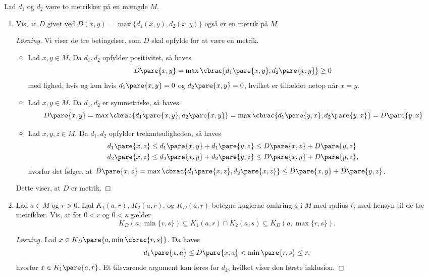 \documentclass{article}
\begin{document}
\begin{opg}
Lad $d_1$ og $d_2$ være to metrikker på en
mængde $M$.  
\begin{enumerate}
\item
Vis, at $D$ givet ved $D(x,y)=\max\{d_1(x,y),d_2(x,y)\}$ også er en metrik på $M$.

\begin{proof}[Løsning]
Vi viser de tre betingelser, som $D$ skal opfylde for at være en metrik.
\begin{itemize}
    \item Lad $x,y\in M$. Da $d_1,d_2$ opfylder positivitet, så haves 
    $$ D\pare{x,y} = \max\cbrac{d_1\pare{x,y},d_2\pare{x,y}} \geq 0 $$
    med lighed, hvis og kun hvis $d_1\pare{x,y} = 0$ og $d_2\pare{x,y} = 0$, hvilket er tilfældet netop når $x = y$.
    
    \item Lad $x,y\in M$. Da $d_1,d_2$ er symmetriske, så haves
    $$ D\pare{x,y} = \max\cbrac{d_1\pare{x,y},d_2\pare{x,y}}
        = \max\cbrac{d_1\pare{y,x},d_2\pare{y,x}} = D\pare{y,x} $$
    
    \item Lad $x,y,z\in M$. Da $d_1,d_2$ opfylder trekantsuligheden, så haves
    \begin{align*}
        d_1\pare{x,z} &\leq d_1\pare{x,y} + d_1\pare{y,z}
            \leq D\pare{x,z} + D\pare{y,z} \\
        d_2\pare{x,z} &\leq d_2\pare{x,y} + d_2\pare{y,z}
            \leq D\pare{x,y} + D\pare{y,z},
    \end{align*}
    hvorfor det følger, at $D\pare{x,z} = \max\cbrac{d_1\pare{x,z},d_2\pare{x,z}} \leq D\pare{x,y} + D\pare{y,z}$.
\end{itemize}
Dette viser, at $D$ er metrik.
\end{proof}

\item Lad $a\in M$ og $r>0$. Lad $K_1(a,r)$, $K_2(a,r)$, og $K_D(a,r)$ betegne kuglerne omkring $a$ i $M$ med radius $r$, med hensyn til de tre metrikker. Vis, at for $0<r$ og $0<s$ gælder
$$ K_D(a,\min\{r,s\})\subseteq K_1(a,r)\cap K_2(a,s)  \subseteq K_D(a,\max\{r,s\}). $$

\begin{proof}[Løsning]
Lad $x\in K_D\pare{a,\min\cbrac{r,s}}$. Da haves
$$ d_1\pare{x,a} \leq D\pare{x,a} < \min\pare{r,s} \leq r, $$
hvorfor $x\in K_1\pare{a,r}$. Et tilsvarende argument kan føres for $d_2$, hvilket viser den første inklusion.


\end{proof}
\end{enumerate}
\end{opg}
\end{document}
